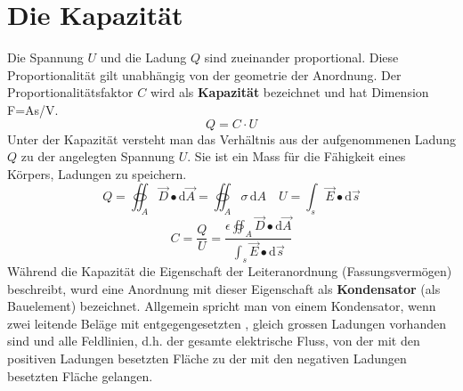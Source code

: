 \section{Die Kapazität}
Die Spannung $U$ und die Ladung $Q$ sind zueinander proportional. Diese Proportionalität gilt unabhängig von der geometrie der Anordnung. Der Proportionalitätsfaktor $C$ wird als \textbf{Kapazität} bezeichnet und hat Dimension F=As/V. 
\begin{equation}
\boxed{Q=C\cdot U}
\end{equation}
Unter der Kapazität versteht man das Verhältnis aus der aufgenommenen Ladung $Q$ zu der angelegten Spannung $U$. Sie ist ein Mass für die Fähigkeit eines Körpers, Ladungen zu speichern.
\begin{equation}
\boxed{Q=\displaystyle \oiint_{A}\overrightarrow{D}\bullet \text{d}\overrightarrow{A}=\displaystyle \oiint_{A}\sigma \,\text{d}A}\quad \boxed{U=\displaystyle \int_s\overrightarrow{E}\bullet \text{d}\overrightarrow{s}}
\end{equation}
\begin{equation}
\boxed{C=\dfrac{Q}{U}=\dfrac{\epsilon \displaystyle \oiint_{A}\overrightarrow{D}\bullet \text{d}\overrightarrow{A}}{\displaystyle \int_s \overrightarrow{E}\bullet \text{d}\overrightarrow{s}}}
\end{equation}
Während die Kapazität die Eigenschaft der Leiteranordnung (Fassungsvermögen) beschreibt, wurd eine Anordnung mit dieser Eigenschaft als \textbf{Kondensator} (als Bauelement) bezeichnet. Allgemein spricht man von einem Kondensator, wenn zwei leitende Beläge mit entgegengesetzten , gleich grossen Ladungen vorhanden sind und alle Feldlinien, d.h. der gesamte elektrische Fluss, von der mit den positiven Ladungen besetzten Fläche zu der mit den negativen Ladungen besetzten Fläche gelangen.
